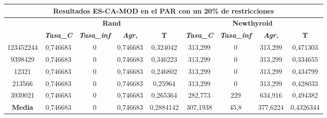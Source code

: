 \documentclass[12pt, spanish]{article}
\begin{document}
\begin{table}[H]
\begin{tabular}{|c|c|c|c|c|c|c|c|c|}
\hline
\multicolumn{9}{|c|}{\textbf{Resultados ES-CA-MOD en el PAR con un 20\% de restricciones}}                                                                                                                        \\ \hline
\multirow{2}{*}{} & \multicolumn{4}{c|}{\textbf{Rand}}                                                            & \multicolumn{4}{c|}{\textbf{Newthyroid}}                                                      \\ \cline{2-9} 
                  & \textit{\textbf{Tasa\_C}} & \textit{\textbf{Tasa\_inf}} & \textit{\textbf{Agr,}} & \textbf{T} & \textit{\textbf{Tasa\_C}} & \textit{\textbf{Tasa\_inf}} & \textit{\textbf{Agr,}} & \textbf{T} \\ \hline
123452244         & 0,746683                  & 0                           & 0,746683               & 0,324042   & 313,299                   & 0                           & 313,299                & 0,471303   \\ \hline
9398429           & 0,746683                  & 0                           & 0,746683               & 0,346223   & 313,299                   & 0                           & 313,299                & 0,334655   \\ \hline
12321             & 0,746683                  & 0                           & 0,746683               & 0,246802   & 313,299                   & 0                           & 313,299                & 0,434799   \\ \hline
213566            & 0,746683                  & 0                           & 0,746683               & 0,25964    & 313,299                   & 0                           & 313,299                & 0,428033   \\ \hline
3939021           & 0,746683                  & 0                           & 0,746683               & 0,265364   & 282,773                   & 229                         & 634,916                & 0,494382   \\ \hline
\textbf{Media}    & 0,746683                  & 0                           & 0,746683               & 0,2884142  & 307,1938                  & 45,8                        & 377,6224               & 0,4326344  \\ \hline
\end{tabular}
\end{table}
\end{document}
